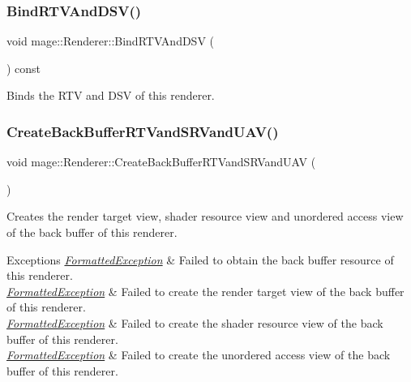 \subsubsection{\texorpdfstring{Bind\+R\+T\+V\+And\+D\+S\+V()}{BindRTVAndDSV()}}
{\footnotesize\ttfamily void mage\+::\+Renderer\+::\+Bind\+R\+T\+V\+And\+D\+SV (\begin{DoxyParamCaption}{ }\end{DoxyParamCaption}) const\hspace{0.3cm}{\ttfamily [noexcept]}}

Binds the R\+TV and D\+SV of this renderer. \hypertarget{classmage_1_1_renderer_a4d89de59be7674cbdb11c37c7b04d94a}{}\label{classmage_1_1_renderer_a4d89de59be7674cbdb11c37c7b04d94a} 
\subsubsection{\texorpdfstring{Create\+Back\+Buffer\+R\+T\+Vand\+S\+R\+Vand\+U\+A\+V()}{CreateBackBufferRTVandSRVandUAV()}}
{\footnotesize\ttfamily void mage\+::\+Renderer\+::\+Create\+Back\+Buffer\+R\+T\+Vand\+S\+R\+Vand\+U\+AV (\begin{DoxyParamCaption}{ }\end{DoxyParamCaption})\hspace{0.3cm}{\ttfamily [private]}}

Creates the render target view, shader resource view and unordered access view of the back buffer of this renderer.


\begin{DoxyExceptions}{Exceptions}
{\em \hyperlink{structmage_1_1_formatted_exception}{Formatted\+Exception}} & Failed to obtain the back buffer resource of this renderer. \\
\hline
{\em \hyperlink{structmage_1_1_formatted_exception}{Formatted\+Exception}} & Failed to create the render target view of the back buffer of this renderer. \\
\hline
{\em \hyperlink{structmage_1_1_formatted_exception}{Formatted\+Exception}} & Failed to create the shader resource view of the back buffer of this renderer. \\
\hline
{\em \hyperlink{structmage_1_1_formatted_exception}{Formatted\+Exception}} & Failed to create the unordered access view of the back buffer of this renderer. \\
\hline
\end{DoxyExceptions}
\hypertarget{classmage_1_1_renderer_afe5bf4339a31eda5a14d1da48fcfe0e9}{}\label{classmage_1_1_renderer_afe5bf4339a31eda5a14d1da48fcfe0e9} 
